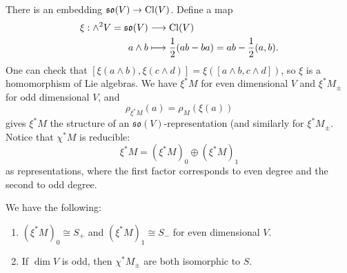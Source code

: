 \begin{remark}
  There is an embedding
  $\mathfrak{so}(V) \to \operatorname{Cl}(V)$.
  Define a map
  \begin{align*}
    \xi : \wedge^2 V = \mathfrak{so}(V)
    &\longrightarrow \operatorname{Cl}(V) \\
    a \wedge b
    &\longmapsto \frac{1}{2} (ab - ba)
    = ab - \frac{1}{2}(a, b).
  \end{align*}
  One can check that
  $[\xi(a \wedge b), \xi(c \wedge d)] = \xi([a \wedge b, c \wedge d])$,
  so $\xi$ is a homomorphism
  of Lie algebras. We have
  $\xi^* M$ for even dimensional
  $V$ and $\xi^* M_{\pm}$ for odd
  dimensional $V$, and
  \[
    \rho_{\xi^* M}(a) = \rho_M(\xi(a))
  \]
  gives $\xi^* M$ the structure of an
  $\mathfrak{so}(V)$-representation
  (and similarly for $\xi^* M_{\pm}$.
  Notice that $\chi^* M$ is reducible:
  \[
    \xi^* M
    = (\xi^* M)_0
    \oplus (\xi^* M)_1
  \]
  as representations, where the
  first factor corresponds to even
  degree
  and the second to odd degree.
\end{remark}

\begin{example}
  We have the following:
  \begin{enumerate}
    \item $(\xi^* M)_0 \cong S_+$
      and $(\xi^* M)_1 \cong S_-$
      for even dimensional $V$.
    \item If $\dim V$ is odd, then
      $\chi^* M_{\pm}$ are both
      isomorphic to $S$.
  \end{enumerate}
\end{example}
